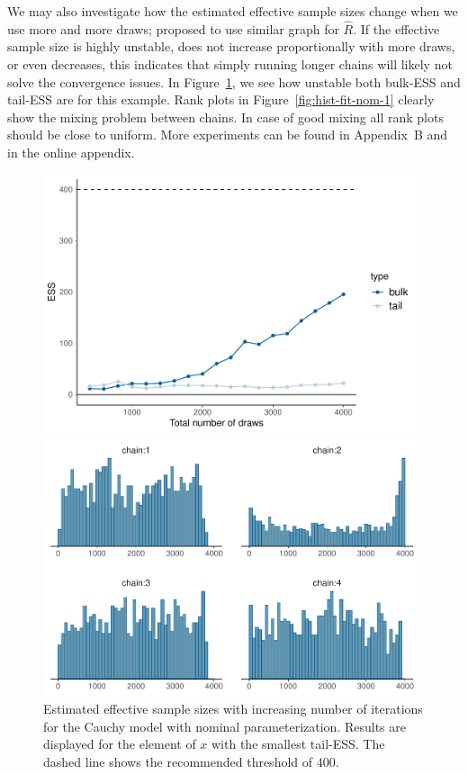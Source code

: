 \documentclass[american,]{article}
\theoremstyle{definition}
\begin{document}
We may also investigate how the estimated effective sample sizes
change when we use more and more draws; \citet{Brooks+Gelman:1998}
proposed to use similar graph for \(\widehat{R}\). If the effective
sample size is highly unstable, does not increase proportionally with
more draws, or even decreases, this indicates that simply running
longer chains will likely not solve the convergence issues. In
Figure~\ref{fig:change-ess-fit-nom-1}, we see how unstable both
bulk-ESS and tail-ESS are for this example.
%
Rank plots in Figure~\ref{fig:hist-fit-nom-1} clearly show the
mixing problem between chains. In case of good mixing all rank plots
should be close to uniform. More experiments can be found in Appendix~B 
and in the online appendix.

\begin{figure}[tp]
  \centering
  \begin{minipage}{0.48\textwidth}
  \includegraphics[width=0.98\textwidth]{graphics/change-ess-fit-nom-1.pdf}
  \caption{Estimated effective sample sizes with increasing number of iterations
  for the Cauchy model with nominal parameterization. Results are displayed 
  for the element of $x$ with the smallest tail-ESS. The dashed line shows the
    recommended threshold of $400$.}
  \label{fig:change-ess-fit-nom-1}
\end{minipage}
\hfill
\begin{minipage}{0.48\textwidth}
  \includegraphics[width=0.98\textwidth]{graphics/hist-fit-nom-1.pdf}

\end{minipage}
\end{figure}
\end{document}

